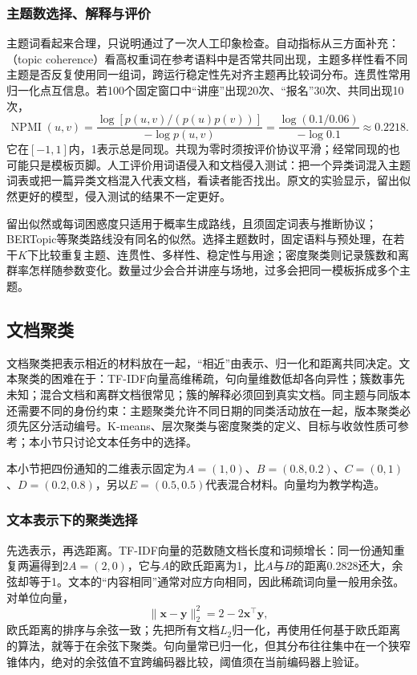 \subsubsection{主题数选择、解释与评价}
\label{sec:nlp-classification-topic-evaluation}

主题词看起来合理，只说明通过了一次人工印象检查。自动指标从三方面补充：（topic coherence）看高权重词在参考语料中是否常共同出现，主题多样性看不同主题是否反复使用同一组词，跨运行稳定性先对齐主题再比较词分布。连贯性常用归一化点互信息。若100个固定窗口中“讲座”出现20次、“报名”30次、共同出现10次，
\[
 \operatorname{NPMI}(u,v)=\frac{\log[p(u,v)/(p(u)p(v))]}{-\log p(u,v)}
 =\frac{\log(0.1/0.06)}{-\log0.1}\approx0.2218.
\]
它在$[-1,1]$内，1表示总是同现。共现为零时须按评价协议平滑；经常同现的也可能只是模板页脚。人工评价用词语侵入和文档侵入测试：把一个异类词混入主题词表或把一篇异类文档混入代表文档，看读者能否找出。原文的实验显示，留出似然更好的模型，侵入测试的结果不一定更好。

留出似然或每词困惑度只适用于概率生成路线，且须固定词表与推断协议；BERTopic等聚类路线没有同名的似然。选择主题数时，固定语料与预处理，在若干$K$下比较重复主题、连贯性、多样性、稳定性与用途；密度聚类则记录簇数和离群率怎样随参数变化。数量过少会合并讲座与场地，过多会把同一模板拆成多个主题。

\subsection{文档聚类}
\label{sec:nlp-classification-clustering}

文档聚类把表示相近的材料放在一起，“相近”由表示、归一化和距离共同决定。文本聚类的困难在于：TF-IDF向量高维稀疏，句向量维数低却各向异性；簇数事先未知；混合文档和离群文档很常见；簇的解释必须回到真实文档。同主题与同版本还需要不同的身份约束：主题聚类允许不同日期的同类活动放在一起，版本聚类必须先区分活动编号。K-means、层次聚类与密度聚类的定义、目标与收敛性质可参考；本小节只讨论文本任务中的选择。

本小节把四份通知的二维表示固定为$A=(1,0)$、$B=(0.8,0.2)$、$C=(0,1)$、$D=(0.2,0.8)$，另以$E=(0.5,0.5)$代表混合材料。向量均为教学构造。

\subsubsection{文本表示下的聚类选择}
\label{sec:nlp-classification-cluster-choice}

先选表示，再选距离。TF-IDF向量的范数随文档长度和词频增长：同一份通知重复两遍得到$2A=(2,0)$，它与$A$的欧氏距离为1，比$A$与$B$的距离0.2828还大，余弦却等于1。文本的“内容相同”通常对应方向相同，因此稀疏词向量一般用余弦。对单位向量，
\[
  \|\bm x-\bm y\|_2^2=2-2\bm x^\top\bm y,
\]
欧氏距离的排序与余弦一致；先把所有文档$L_2$归一化，再使用任何基于欧氏距离的算法，就等于在余弦下聚类。句向量常已归一化，但其分布往往集中在一个狭窄锥体内，绝对的余弦值不宜跨编码器比较，阈值须在当前编码器上验证。

